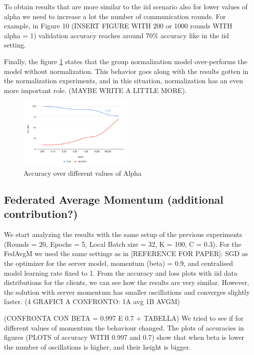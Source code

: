\documentclass[twocolumn]{article}
\begin{document}
To obtain results that are more similar to the iid scenario also for lower values of alpha we need to increase a lot the number of communication rounds. For example, in Figure 10 (INSERT FIGURE WITH 200 or 1000 rounds WITH alpha = 1) validation accuracy reaches around 70\% accuracy like in the iid setting.

Finally, the figure \ref{AccAlpha} states that the group normalization model over-performs the model without normalization. This behavior goes along with the results gotten in the normalization experiments, and in this situation, normalization has an even more important role. (MAYBE WRITE A LITTLE MORE).


\begin{figure}
    \centering
    \includegraphics[width=0.5\textwidth,height=.3\textheight]{alphaAccuracy.png}
    \caption{Accuracy over different values of Alpha}
    \label{AccAlpha} 
\end{figure}


\subsection{Federated Average Momentum (additional contribution?)}
We start analyzing the results with the same setup of the previous experiments (Rounds = 20, Epochs = 5, Local Batch size = 32, K = 100, C = 0.3).
For the FedAvgM we used the same settings as in [REFERENCE FOR PAPER]: SGD as the optimizer for the server model,  momentum (beta) = 0.9, and centralised model learning rate fixed to 1.
From the accuracy and loss plots with iid data distributions for the clients, we can see how the results are very similar. However, the solution with server momentum has smaller oscillations and converges slightly faster. 
(4 GRAFICI A CONFRONTO: 1A avg 1B AVGM)

(CONFRONTA CON BETA = 0.997 E 0.7 + TABELLA)
We tried to see if for different values of momentum the behaviour changed. The plots of accuracies in figures (PLOTS of accuracy WITH 0.997 and 0.7) show that when beta is lower the number of oscillations is higher, and their height is bigger.
\end{document}
